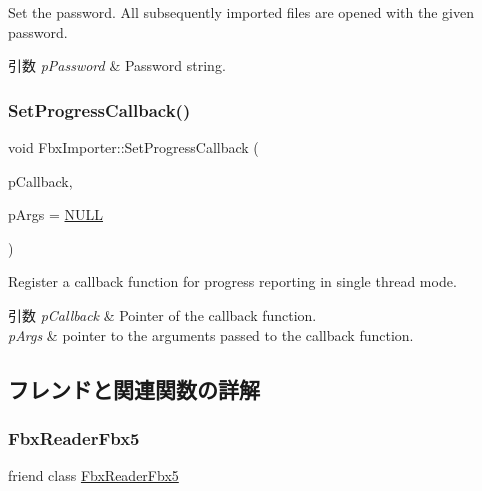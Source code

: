 Set the password. All subsequently imported files are opened with the given password. 
\begin{DoxyParams}{引数}
{\em p\+Password} & Password string. \\
\hline
\end{DoxyParams}
\mbox{\label{class_fbx_importer_adcb26ff112db465208caefc5c5d8a6e1}} 
\subsubsection{\texorpdfstring{Set\+Progress\+Callback()}{SetProgressCallback()}}
{\footnotesize\ttfamily void Fbx\+Importer\+::\+Set\+Progress\+Callback (\begin{DoxyParamCaption}\item[{\hyperlink{fbxprogress_8h_a3765040904b462fb1f2673caba3488db}{Fbx\+Progress\+Callback}}]{p\+Callback,  }\item[{void $\ast$}]{p\+Args = {\ttfamily \hyperlink{fbxarch_8h_a070d2ce7b6bb7e5c05602aa8c308d0c4}{N\+U\+LL}} }\end{DoxyParamCaption})}

Register a callback function for progress reporting in single thread mode. 
\begin{DoxyParams}{引数}
{\em p\+Callback} & Pointer of the callback function. \\
\hline
{\em p\+Args} & pointer to the arguments passed to the callback function. \\
\hline
\end{DoxyParams}


\subsection{フレンドと関連関数の詳解}
\mbox{\label{class_fbx_importer_a66e1b4e7536dcd24ce7d7f48cf6b6e65}} 
\subsubsection{\texorpdfstring{Fbx\+Reader\+Fbx5}{FbxReaderFbx5}}
{\footnotesize\ttfamily friend class \hyperlink{class_fbx_reader_fbx5}{Fbx\+Reader\+Fbx5}\hspace{0.3cm}{\ttfamily [friend]}}



